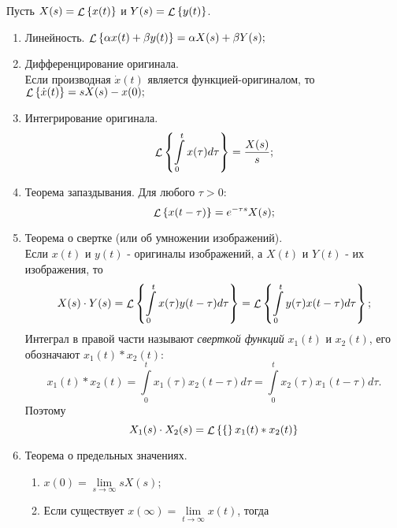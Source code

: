 \documentclass[../../TAU.tex]{subfiles}
\begin{document}
    Пусть 
    $X(s) = \mathop{\mathcal{L}}\nolimits\left\{x(t)\right\}$ и 
    $Y(s) = \mathop{\mathcal{L}}\nolimits\left\{y(t)\right\}$.
    \begin{enumerate}
        \item Линейность. $\mathop{\mathcal{L}}\nolimits\left\{\alpha x(t) + \beta y(t)\right\} = \alpha X(s) + \beta Y(s);$
        \item Дифференцирование оригинала. \\
            Если производная 
            $\dot x(t)$ 
            является функцией-оригиналом, то 
            $\mathop{\mathcal{L}}\nolimits\left\{\dot x(t)\right\} = sX(s) - x(0);$
        \item Интегрирование оригинала.
            \begin{equation}
                \mathop{\mathcal{L}}\nolimits\left\{\int\limits_0^tx(\tau)d\tau\right\} = \frac{X(s)}{s};
            \end{equation}
        \item Теорема запаздывания. Для любого $\tau>0$:
            \begin{equation}
                \mathop{\mathcal{L}}\nolimits\left\{x(t-\tau)\right\} = e^{-\tau s}X(s);
            \end{equation}
        \item  Теорема о свертке (или об умножении изображений).\\
            Если $x(t)$ и $y(t)$ - оригиналы изображений, а $X(t)$ и $Y(t)$ - их изображения, то
            \begin{equation}
                X(s)\cdot Y(s) = \mathop{\mathcal{L}}\nolimits\left\{\int\limits_0^tx(\tau)y(t-\tau)d\tau\right\} = \mathop{\mathcal{L}}\nolimits\left\{\int\limits_0^ty(\tau)x(t-\tau)d\tau\right\};
            \end{equation}
            Интеграл в правой части называют {\it сверткой функций} $x_1(t)$ и $x_2(t)$, его обозначают $x_1(t) * x_2(t)$:
            \begin{equation}
                x_1(t)*x_2(t) = \int\limits_0^t x_1(\tau) x_2(t-\tau) d{\tau} = \int\limits_0^t x_2(\tau) x_1(t-\tau)d\tau.
            \end{equation}
            Поэтому 
            \begin{equation}
                X_1(s) \cdot X_2(s) = \mathop{\mathcal{L}}\nolimits\left\{\{\right\}x_1(t) * x_2(t)\}
            \end{equation}
        \item Теорема о предельных значениях.
            \begin{enumerate}[label*={\arabic*}]
                \item 
                    $x(0) = \lim\limits_{s\rightarrow\infty}sX(s)$;
                \item Если существует 
                    $x(\infty) = \lim\limits_{t\rightarrow\infty} x(t)$, тогда 

\end{enumerate}
\end{enumerate}
\end{document}
